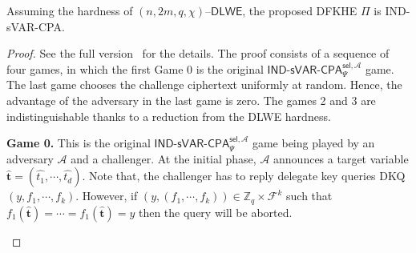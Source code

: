 \documentclass[runningheads,10pt]{llncs}
\begin{document}
\begin{theorem}  \label{varcpa}
	Assuming the hardness of $(n,2m,q,\chi)$--$\mathsf{DLWE}$, the proposed DFKHE $\Pi$ is IND-sVAR-CPA.
\end{theorem}
\begin{proof} 
	See the full version~\cite{fullversion} for the details.
	\iffalse 
	The proof consists of a sequence of four games, in which the first Game 0 is 
	the original  $\mathsf{IND}$-$\mathsf{sVAR}$-$\mathsf{CPA}^{\mathsf{sel},\mathcal{A}}_{\Psi}$ game.
	The last game chooses the challenge ciphertext uniformly at random.	Hence, the advantage of the adversary in the last game is zero.	The games 2 and 3 are indistinguishable thanks to a reduction from the DLWE hardness. 
	\begin{description}
		\item  \textbf{Game 0.} This is the original  $\mathsf{IND}$-$\mathsf{sVAR}$-$\mathsf{CPA}^{\mathsf{sel},\mathcal{A}}_{\Psi}$ 
		game being played by an adversary $\mathcal{A}$ and a challenger. 
		At the initial phase, $\mathcal{A}$ announces a target variable  $\widehat{\mathbf{t}}=(\widehat{t_1}, \cdots, \widehat{t_d})$. 
		Note that, the challenger has to reply delegate key queries DKQ$(y, f_1,\cdots, f_k)$. However, if $(y,(f_1,\cdots, f_k)) \in \mathbb{Z}_q\times \mathcal{F}^k$ such that $f_1(\widehat{\mathbf{t}})=\cdots=f_1(\widehat{\mathbf{t}})=y$ then the query will be aborted.
		

\end{description}
\end{proof}
\end{document}

